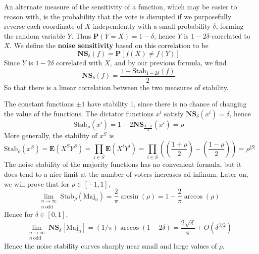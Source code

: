 An alternate measure of the sensitivity of a function, which may be easier to reason with, is the probability that the vote is disrupted if we purposefully reverse each coordinate of $X$ independently with a small probability $\delta$, forming the random variable $Y$. Thus $\mathbf{P}(Y = X) = 1 - \delta$, hence $Y$ is $1 - 2\delta$-correlated to $X$. We define the {\bf noise sensitivity} based on this correlation to be
%
\[ \mathbf{NS}_\delta(f) = \mathbf{P}[ f(X) \neq f(Y) ]\]
%
Since $Y$ is $1 - 2\delta$ correlated with $X$, and by our previous formula, we find
%
\[ \mathbf{NS}_\delta(f) = \frac{1 - \text{Stab}_{1 - 2\delta}(f)}{2} \]
%
So that there is a linear correlation between the two measures of stability.

\begin{example}
    The constant functions $\pm 1$ have stability 1, since there is no chance of changing the value of the functions. The dictator functions $x^i$ satisfy $\mathbf{NS}_\delta(x^i) = \delta$, hence
    \[ \text{Stab}_\rho(x^i) = 1 - 2 \mathbf{NS}_{\frac{1 - \rho}{2}}(x^i) = \rho \]
    More generally, the stability of $x^S$ is
    \[ \text{Stab}_\rho(x^S) = \mathbf{E}(X^SY^S) = \prod_{i \in S} \mathbf{E}(X^iY^i) = \prod_{i \in S} \left( \left( \frac{1 + \rho}{2} \right) - \left( \frac{1 - \rho}{2} \right) \right) = \rho^{|S|} \]
    The noise stability of the majority functions has no convenient formula, but it does tend to a nice limit at the number of voters increases ad infinum. Later on, we will prove that for $\rho \in [-1,1]$,
    \[ \lim_{\substack{n \to \infty\\n\ \text{odd}}} \text{Stab}_\rho(\text{Maj}_n) = \frac{2}{\pi} \arcsin(\rho) = 1 - \frac{2}{\pi} \arccos(\rho) \]
    Hence for $\delta \in [0,1]$,
    \[ \lim_{\substack{n \to \infty\\n\ \text{odd}}} \mathbf{NS}_\delta[\text{Maj}_n] = (1/\pi) \arccos(1 - 2 \delta) = \frac{2\sqrt{\delta}}{\pi} + O(\delta^{3/2}) \]
    Hence the noise stability curves sharply near small and large values of $\rho$.
\end{example}

